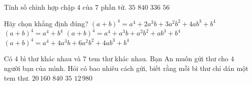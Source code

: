 \begin{ex}%
Tính số chỉnh hợp chập $4$ của $7$ phần tử.
\choice
{$35$}
{\True  $840$}
{$336$}
{$56$}
\end{ex}

\begin{ex}%
Hãy chọn khẳng định đúng?
\choice
{$(a+b)^4=a^4+2a^3b+3a^2b^2+4ab^3+b^4$}
{$(a+b)^4=a^4+b^4$}
{$(a+b)^4=a^4+a^3b+a^2b^2+ab^3+b^4$}
{\True $(a+b)^4=a^4+4a^3b+6a^2b^2+4ab^3+b^4$}
\end{ex}

\begin{ex}%
Có $4$ bì thư khác nhau và $7$ tem thư khác nhau. Bạn An muốn gửi thư cho $4$ người bạn của mình. Hỏi có bao nhiêu cách gửi, biết rằng mỗi bì thư chỉ dán một tem thư.
\choice
{\True $20\,160$}
{$840$}
{$35$}
{$12\,980$}
\end{ex}

